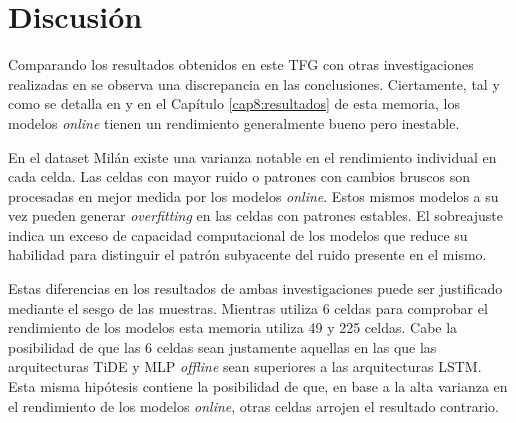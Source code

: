 \section{Discusión}
Comparando los resultados obtenidos en este TFG con otras investigaciones realizadas en \cite{tfgalicia} se observa una discrepancia en las conclusiones. Ciertamente, tal y como se detalla en \cite{tfgalicia} y en el Capítulo \ref{cap8:resultados} de esta memoria, los modelos \textit{online} tienen un rendimiento generalmente bueno pero inestable. 

En el dataset Milán existe una varianza notable en el rendimiento individual en cada celda. Las celdas con mayor ruido o patrones con cambios bruscos son procesadas en mejor medida por los modelos \textit{online}. Estos mismos modelos a su vez pueden generar \textit{overfitting} en las celdas con patrones estables. El sobreajuste indica un exceso de capacidad computacional de los modelos que reduce su habilidad para distinguir el patrón subyacente del ruido presente en el mismo.

Estas diferencias en los resultados de ambas investigaciones puede ser justificado mediante el sesgo de las muestras. Mientras \cite{tfgalicia} utiliza 6 celdas para comprobar el rendimiento de los modelos esta memoria utiliza 49 y 225 celdas. Cabe la posibilidad de que las 6 celdas sean justamente aquellas en las que las arquitecturas TiDE y MLP \textit{offline} sean superiores a las arquitecturas LSTM. Esta misma hipótesis contiene la posibilidad de que, en base a la alta varianza en el rendimiento de los modelos \textit{online}, otras celdas arrojen el resultado contrario.
